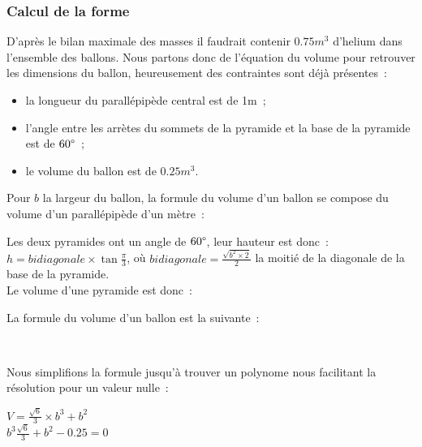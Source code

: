 \documentclass[a4paper,11pt]{article}
\begin{document}
\subsubsection{Calcul de la forme}

D'après le bilan maximale des masses il faudrait contenir $0.75m^3$ d'helium dans l'ensemble des ballons. Nous partons donc de l'équation du volume pour retrouver les dimensions du ballon, heureusement des contraintes sont déjà présentes~:

\begin{itemize}
 \item la longueur du parallépipède central est de 1m~;
 \item l'angle entre les arrètes du sommets de la pyramide et la base de la pyramide est de $60 \degree$~;
 \item le volume du ballon est de $0.25m^3$.
\end{itemize}

\bigbreak

Pour $b$ la largeur du ballon, la formule du volume d'un ballon se compose du volume d'un parallépipède d'un mètre~:

\begin{center}
\end{center}

Les deux pyramides ont un angle de $60 \degree$, leur hauteur est donc~: $\displaystyle{h = bidiagonale \times \tan{\frac{\pi}{3}}}$, où $\displaystyle{bidiagonale = \frac{\sqrt{b^2 \times 2}}{2}}$ la moitié de la diagonale de la base de la pyramide. \\
Le volume d'une pyramide est donc~:

\begin{center}
\end{center}

La formule du volume d'un ballon est la suivante~:

\begin{center}
	 \\
\end{center}

Nous simplifions la formule jusqu'à trouver un polynome nous facilitant la résolution pour un valeur nulle~:

\begin{center}
  $\displaystyle{V = \frac{\sqrt{6}}{3} \times b^3 + b^2 }$ \\
  $\displaystyle{b^3 \frac{\sqrt{6}}{3} + b^2 - 0.25 = 0}$
\end{center}
\end{document}
